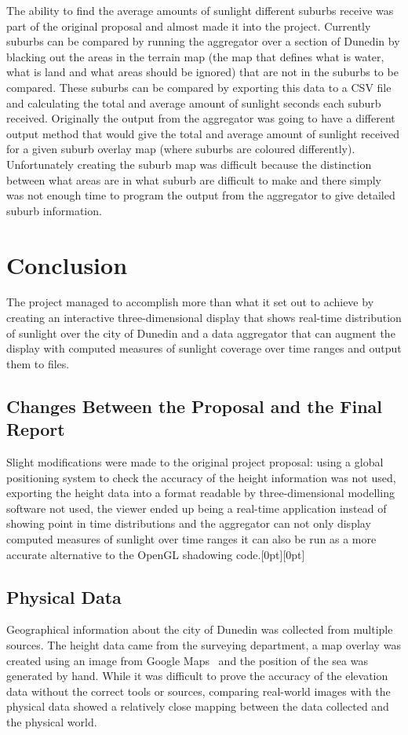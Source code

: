 \documentclass[12pt]{report}
\newcommand{\note}[1]{\raisebox{0pt}[0pt][0pt]{\pdfcomment[open=true]{#1}}}
\newcommand{\notedme}[1]{\note{#1}}
\begin{document}
The ability to find the average amounts of sunlight different suburbs receive was part of the original proposal and almost made it into the project. Currently suburbs can be compared by running the aggregator over a section of Dunedin by blacking out the areas in the terrain map (the map that defines what is water, what is land and what areas should be ignored) that are not in the suburbs to be compared. These suburbs can be compared by exporting this data to a CSV file and calculating the total and average amount of sunlight seconds each suburb received. Originally the output from the aggregator was going to have a different output method that would give the total and average amount of sunlight received for a given suburb overlay map (where suburbs are coloured differently). Unfortunately creating the suburb map was difficult because the distinction between what areas are in what suburb are difficult to make and there simply was not enough time to program the output from the aggregator to give detailed suburb information.

\chapter{Conclusion}
The project managed to accomplish more than what it set out to achieve by creating an interactive three-dimensional display that shows real-time distribution of sunlight over the city of Dunedin and a data aggregator that can augment the display with computed measures of sunlight coverage over time ranges and output them to files. 

\section{Changes Between the Proposal and the Final Report}
Slight modifications were made to the original project proposal: using a global positioning system to check the accuracy of the height information was not used, exporting the height data into a format readable by three-dimensional modelling software not used, the viewer ended up being a real-time application instead of showing point in time distributions and the aggregator can not only display computed measures of sunlight over time ranges it can also be run as a more accurate alternative to the OpenGL shadowing code.\notedme{Yep - good stuff! :-)}

\section{Physical Data}
Geographical information about the city of Dunedin was collected from multiple sources. The height data came from the surveying department, a map overlay was created using an image from Google Maps~\cite{gmaps} and the position of the sea was generated by hand. While it was difficult to prove the accuracy of the elevation data without the correct tools or sources, comparing real-world images with the physical data showed a relatively close mapping between the data collected and the physical world.
\end{document}
